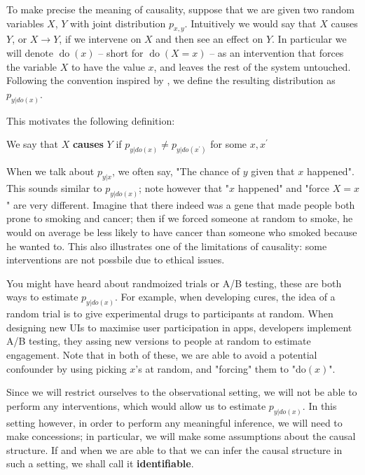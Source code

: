 To make precise the meaning of causality, suppose that we are given 
two random variables $X$, $Y$ with joint distribution $p_{x, y}$. Intuitively we 
would say that $X$ causes $Y$, or $X \rightarrow Y$, if we intervene on $X$ and then see an effect on $Y$. In particular
we will denote $\operatorname{do}(x)$ -- short for $\operatorname{do}(X = x)$ -- as an intervention
that forces the variable $X$ to have the value $x$, and leaves the rest of the system untouched. 
Following the convention inspired by \cite{pearl2000causality}, 
we define the resulting distribution as $p_{y|do(x)}$.

This motivates the following definition:

\begin{definition}
    We say that $X$ \textbf{causes} $Y$ if $p_{y|do(x)} \neq p_{y|do(x^\prime)}$ for some
    $x, x^\prime$
\end{definition}

When we talk about $p_{y|x}$, we often say, "The chance of $y$ given that $x$ happened". This sounds similar
to $p_{y|do(x)}$; note however that "$x$ happened" and "force $X = x$" are very different. Imagine that 
there indeed was a gene that made people both prone to smoking and cancer; then if we forced someone at 
random to smoke, he would on average be less likely to have cancer than someone who smoked because he wanted to.
This also illustrates 
one of the limitations of causality: some interventions are not possbile due to ethical issues.

You might have heard about randmoized trials or A/B testing, these are both ways to estimate $p_{y|do(x)}$.
For example, when developing cures, the idea of a random trial is to give experimental drugs to participants
at random. When designing new UIs to maximise user participation in apps, developers implement A/B testing, 
they assing new versions to people at random to estimate engagement. Note that in both of these, we are able 
to avoid a potential confounder by using picking $x$'s at random, and "forcing" them to "do$(x)$".

Since we will restrict ourselves to the observational setting, we will not be able to perform any interventions,
which would allow us to estimate $p_{y|do(x)}$. In this setting however, in order to perform any meaningful
inference, we will need to make concessions; in particular, we will make some assumptions about 
the causal structure. If and when we are able to that we can infer the causal structure in such a setting, we 
shall call it \textbf{identifiable}.

